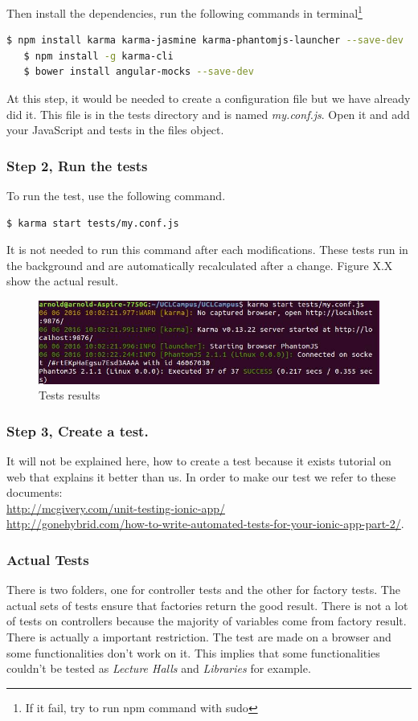 \documentclass{eplmastersthesis}
\begin{document}
Then install the dependencies, run the following commands in terminal\footnote{If it fail, try to run npm command with sudo}
\begin{lstlisting}[language=bash]
   $ npm install karma karma-jasmine karma-phantomjs-launcher --save-dev
   $ npm install -g karma-cli
   $ bower install angular-mocks --save-dev
\end{lstlisting}

At this step, it would be needed to create a configuration file but we have already did it. This file is in the tests directory and is named \textit{my.conf.js}. Open it and add your JavaScript and tests in the files object.

\subsubsection{Step 2, Run the tests} To run the test, use the following command.
\begin{lstlisting}[language=bash]
   $ karma start tests/my.conf.js
\end{lstlisting}
It is not needed to run this command after each modifications. These tests run in the background and are automatically recalculated after a change. Figure X.X show the actual result.
\begin{figure}[H]
\centering
\includegraphics[scale = 0.7]{Images/tests.png}
\caption{Tests results}
\end{figure}

\subsubsection{Step 3, Create a test.} It will not be explained here, how to create a test because it exists tutorial on web that explains it better than us. In order to make our test we refer to these documents:\\
 \url{http://mcgivery.com/unit-testing-ionic-app/}\\ \url{http://gonehybrid.com/how-to-write-automated-tests-for-your-ionic-app-part-2/}.

\subsubsection{Actual Tests}
There is two folders, one for controller tests and the other for factory tests. The actual sets of tests ensure that factories return the good result. There is not a lot of tests on controllers because the majority of variables come from factory result. There is actually a important restriction. The test are made on a browser and some functionalities don't work on it. This implies that some functionalities couldn't be tested as \textit{Lecture Halls} and\textit{ Libraries }for example.
\end{document}
